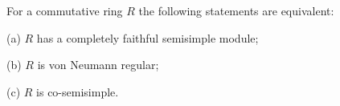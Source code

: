 For a commutative ring $R$ the following statements are equivalent:

(a) $R$ has a completely faithful semisimple module;

(b) $R$ is von Neumann regular;

(c) $R$ is co-semisimple.
